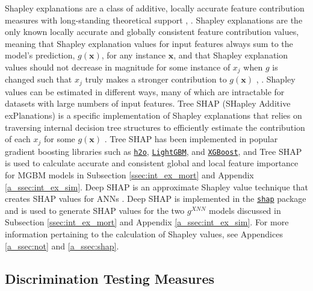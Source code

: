 \documentclass[information,article,submit,moreauthors,pdftex]{definitions/mdpi}
\begin{document}
Shapley explanations are a class of additive, locally accurate feature contribution measures with long-standing theoretical support \cite{shapley}, \cite{shapley1988shapley}. Shapley explanations are the only known locally accurate and globally consistent feature contribution values, meaning that Shapley explanation values for input features always sum to the model's prediction, $g(\mathbf{x})$, for any instance $\mathbf{x}$, and that Shapley explanation values should not decrease in magnitude for some instance of $x_j$ when $g$ is changed such that $x_j$ truly makes a stronger contribution to $g(\mathbf{x})$ \cite{shapley}, \cite{tree_shap}. Shapley values can be estimated in different ways, many of which are intractable for datasets with large numbers of input features. Tree SHAP (SHapley Additive exPlanations) is a specific implementation of Shapley explanations that relies on traversing internal decision tree structures to efficiently estimate the contribution of each $x_j$ for some $g(\mathbf{x})$ \cite{tree_shap}. Tree SHAP has been implemented in popular gradient boosting libraries such as \href{http://docs.h2o.ai/h2o/latest-stable/h2o-py/docs/modeling.html#h2ogradientboostingestimator}{\texttt{h2o}}, \href{https://lightgbm.readthedocs.io/en/latest/Python-Intro.html}{\texttt{LightGBM}}, and \href{https://xgboost.readthedocs.io/en/latest/python/python_intro.html}{\texttt{XGBoost}}, and Tree SHAP is used to calculate accurate and consistent global and local feature importance for MGBM models in Subsection \ref{ssec:int_ex_mort} and Appendix \ref{a_ssec:int_ex_sim}. Deep SHAP is an approximate Shapley value technique that creates SHAP values for ANNs \cite{shapley}. Deep SHAP is implemented in the \href{https://github.com/slundberg/shap}{\texttt{shap}} package and is used to generate SHAP values for the two $g^{XNN}$ models discussed in Subsection \ref{ssec:int_ex_mort} and Appendix \ref{a_ssec:int_ex_sim}. For more information pertaining to the calculation of Shapley values, see Appendices \ref{a_ssec:not} and \ref{a_ssec:shap}.

\subsection{Discrimination Testing Measures}\label{ssec:di}
\end{document}
